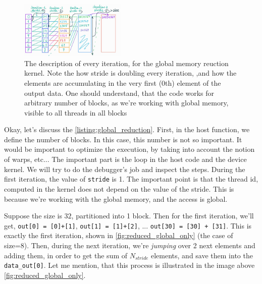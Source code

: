 \begin{figure}
   \vspace{-0.9cm}
   \begin{center}
   \includegraphics[width=0.45\textwidth]{pngs/reduce_only_global.jpg}
   \end{center}
   \vspace{-0.5cm}
   \captionsetup{justification=raggedleft}
   \caption{The description of every iteration, for the global memory 
   reuction kernel. Note the how stride is doubling every iteration, 
   ,and how the elements are accumulating in the very first (0th) element of the output data. 
   One should understand, that the code works for arbitrary number of blocks, as we're working with global 
   memory, visible to all threads in all blocks}
   \label{fig:reduced_global_only}
\end{figure}

Okay, let's discuss the \autoref{listing:global_reduction}. First, in the host function, we define the number of blocks. 
In this case, this number is not so important. It would be important to optimize the execution, 
by taking into account the notion of warps, etc... The important part is the loop in the host code and 
the device kernel. We will try to do the debugger's job and inspect the steps. 
During the first iteration, the value of \verb|stride| is 1. The important point is that the thread id, 
computed in the kernel does not depend on the value of the stride. This is because we're working with the global 
memory, and the access is global.

Suppose the size is $32$, partitioned into 1 block. Then for the first iteration, we'll get, 
\verb|out[0] = [0]+[1]|, \verb|out[1] = [1]+[2]|, ... \verb|out[30] = [30] + [31]|. This is exactly the first iteration, 
shown in \autoref{fig:reduced_global_only} (the case of size=8). Then, during the next iteration, we're 
\textit{jumping} over 2 next elements and adding them, in order to get the sum of $N_{stride}$ elements, and save them 
into the \verb|data_out[0]|. Let me mention, that this process is illustrated in the image above \autoref{fig:reduced_global_only}.

